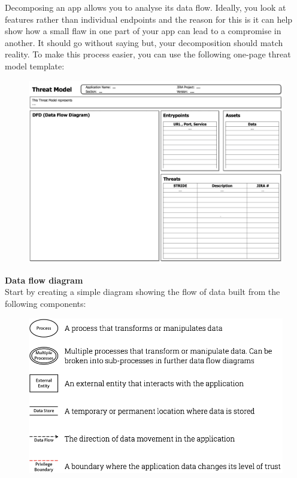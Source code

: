 \documentclass[a5paper,pagesize,10pt,bibtotoc,DIV=10,twoside]{scrbook}
\begin{document}
Decomposing an app allows you to analyse its data flow. Ideally, you look at features rather than individual endpoints and the reason for this is it can help show how a small flaw in one part of your app can lead to a compromise in another. It should go without saying but, your decomposition should match reality. To make this process easier, you can use the following one-page threat model template:
\begin{figure}[H]
\includegraphics[scale=0.25]{images/threat1}\cite{threatModel}
\end{figure}

\textbf{Data flow diagram}\\

Start by creating a simple diagram showing the flow of data built from the following components:
\begin{figure}[H]
\includegraphics[scale=0.4]{images/DFD}
\end{figure}
\end{document}
